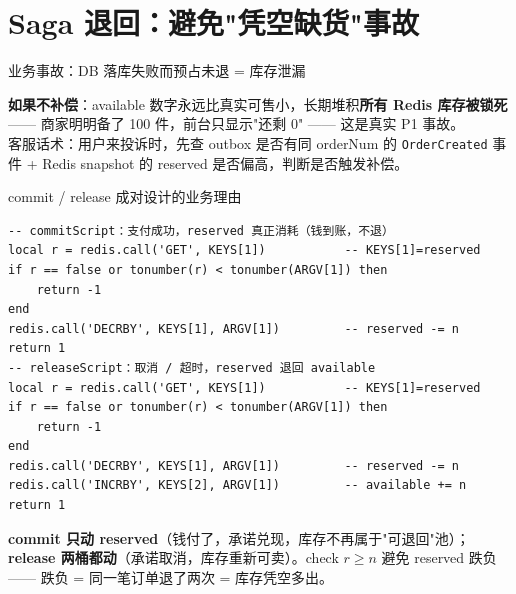 \documentclass[aspectratio=169,11pt]{beamer}
\begin{document}
\section{Saga 退回：避免"凭空缺货"事故}

\begin{frame}[shrink]{业务事故：DB 落库失败而预占未退 = 库存泄漏}
\begin{center}
\end{center}
\vspace{1mm}
\small \textbf{如果不补偿}：available 数字永远比真实可售小，长期堆积\textbf{所有 Redis 库存被锁死} —— 商家明明备了 100 件，前台只显示"还剩 0" —— 这是真实 P1 事故。\\
客服话术：用户来投诉时，先查 outbox 是否有同 orderNum 的 \texttt{OrderCreated} 事件 + Redis snapshot 的 reserved 是否偏高，判断是否触发补偿。
\end{frame}

\begin{frame}{commit / release 成对设计的业务理由}
\begin{lstlisting}[language=LuaRedis,firstnumber=48,
  caption={}]
-- commitScript：支付成功，reserved 真正消耗（钱到账，不退）
local r = redis.call('GET', KEYS[1])           -- KEYS[1]=reserved
if r == false or tonumber(r) < tonumber(ARGV[1]) then
    return -1
end
redis.call('DECRBY', KEYS[1], ARGV[1])         -- reserved -= n
return 1
-- releaseScript：取消 / 超时，reserved 退回 available
local r = redis.call('GET', KEYS[1])           -- KEYS[1]=reserved
if r == false or tonumber(r) < tonumber(ARGV[1]) then
    return -1
end
redis.call('DECRBY', KEYS[1], ARGV[1])         -- reserved -= n
redis.call('INCRBY', KEYS[2], ARGV[1])         -- available += n
return 1
\end{lstlisting}
\small \textbf{commit 只动 reserved}（钱付了，承诺兑现，库存不再属于"可退回"池）；\textbf{release 两桶都动}（承诺取消，库存重新可卖）。check $r \geq n$ 避免 reserved 跌负 —— 跌负 = 同一笔订单退了两次 = 库存凭空多出。
\end{frame}
\end{document}
